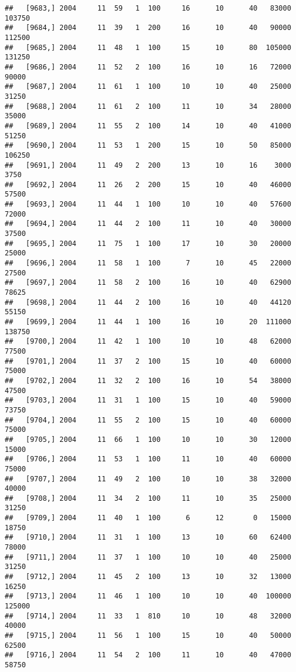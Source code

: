 \documentclass{article}\usepackage[]{graphicx}\usepackage[]{color}
\makeatletter
\newenvironment{kframe}{%
 \def\at@end@of@kframe{}%
 \ifinner\ifhmode%
  \def\at@end@of@kframe{\end{minipage}}%
  \begin{minipage}{\columnwidth}%
 \fi\fi%
 \def\FrameCommand##1{\hskip\@totalleftmargin \hskip-\fboxsep
 \colorbox{shadecolor}{##1}\hskip-\fboxsep
     \hskip-\linewidth \hskip-\@totalleftmargin \hskip\columnwidth}%
 \MakeFramed {\advance\hsize-\width
   \@totalleftmargin\z@ \linewidth\hsize
   \@setminipage}}%
 {\par\unskip\endMakeFramed%
 \at@end@of@kframe}
\newenvironment{knitrout}{}{} %
\makeatother
\begin{document}
\begin{knitrout}
\begin{kframe}
\begin{verbatim}
##   [9683,] 2004     11  59   1  100     16      10      40   83000  103750
##   [9684,] 2004     11  39   1  200     16      10      40   90000  112500
##   [9685,] 2004     11  48   1  100     15      10      80  105000  131250
##   [9686,] 2004     11  52   2  100     16      10      16   72000   90000
##   [9687,] 2004     11  61   1  100     10      10      40   25000   31250
##   [9688,] 2004     11  61   2  100     11      10      34   28000   35000
##   [9689,] 2004     11  55   2  100     14      10      40   41000   51250
##   [9690,] 2004     11  53   1  200     15      10      50   85000  106250
##   [9691,] 2004     11  49   2  200     13      10      16    3000    3750
##   [9692,] 2004     11  26   2  200     15      10      40   46000   57500
##   [9693,] 2004     11  44   1  100     10      10      40   57600   72000
##   [9694,] 2004     11  44   2  100     11      10      40   30000   37500
##   [9695,] 2004     11  75   1  100     17      10      30   20000   25000
##   [9696,] 2004     11  58   1  100      7      10      45   22000   27500
##   [9697,] 2004     11  58   2  100     16      10      40   62900   78625
##   [9698,] 2004     11  44   2  100     16      10      40   44120   55150
##   [9699,] 2004     11  44   1  100     16      10      20  111000  138750
##   [9700,] 2004     11  42   1  100     10      10      48   62000   77500
##   [9701,] 2004     11  37   2  100     15      10      40   60000   75000
##   [9702,] 2004     11  32   2  100     16      10      54   38000   47500
##   [9703,] 2004     11  31   1  100     15      10      40   59000   73750
##   [9704,] 2004     11  55   2  100     15      10      40   60000   75000
##   [9705,] 2004     11  66   1  100     10      10      30   12000   15000
##   [9706,] 2004     11  53   1  100     11      10      40   60000   75000
##   [9707,] 2004     11  49   2  100     10      10      38   32000   40000
##   [9708,] 2004     11  34   2  100     11      10      35   25000   31250
##   [9709,] 2004     11  40   1  100      6      12       0   15000   18750
##   [9710,] 2004     11  31   1  100     13      10      60   62400   78000
##   [9711,] 2004     11  37   1  100     10      10      40   25000   31250
##   [9712,] 2004     11  45   2  100     13      10      32   13000   16250
##   [9713,] 2004     11  46   1  100     10      10      40  100000  125000
##   [9714,] 2004     11  33   1  810     10      10      48   32000   40000
##   [9715,] 2004     11  56   1  100     15      10      40   50000   62500
##   [9716,] 2004     11  54   2  100     11      10      40   47000   58750

\end{verbatim}
\end{kframe}
\end{knitrout}
\end{document}
